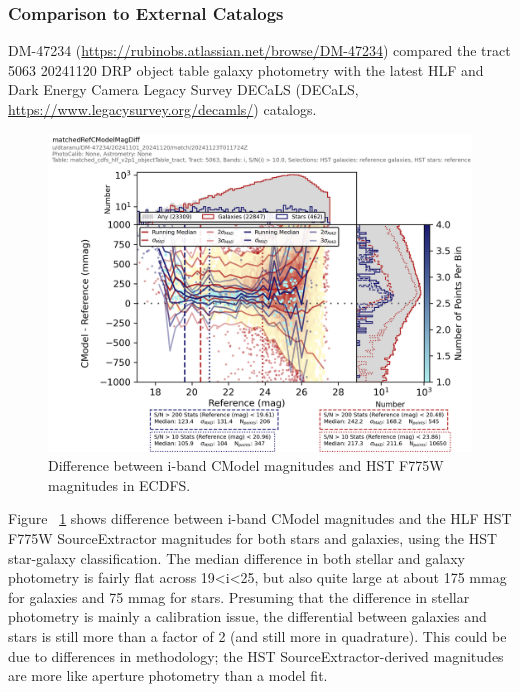 \subsubsection{Comparison to External Catalogs}
\label{subsec:galaxy_photometry_external_catalogs}

DM-47234 (\url{https://rubinobs.atlassian.net/browse/DM-47234}) compared the tract 5063 20241120 DRP object table galaxy photometry with the latest HLF and Dark Energy Camera Legacy Survey DECaLS (DECaLS, \url{https://www.legacysurvey.org/decamls/}) catalogs.

\begin{figure}
  \includegraphics{galaxy_photometry/cdfs_i_vs_HST_F775W.png}
  \caption{Difference between i-band CModel magnitudes and HST F775W magnitudes in ECDFS.}
  \label{fig:cdfs_i_vs_HST_F775W}
\end{figure}

Figure ~\ref{fig:cdfs_i_vs_HST_F775W} shows difference between i-band CModel magnitudes and the HLF HST F775W SourceExtractor magnitudes for both stars and galaxies, using the HST star-galaxy classification.
The median difference in both stellar and galaxy photometry is fairly flat across 19<i<25, but also quite large at about 175 mmag for galaxies and 75 mmag for stars.
Presuming that the difference in stellar photometry is mainly a calibration issue, the differential between galaxies and stars is still more than a factor of 2 (and still more in quadrature).
This could be due to differences in methodology; the HST SourceExtractor-derived magnitudes are more like aperture photometry than a model fit.

